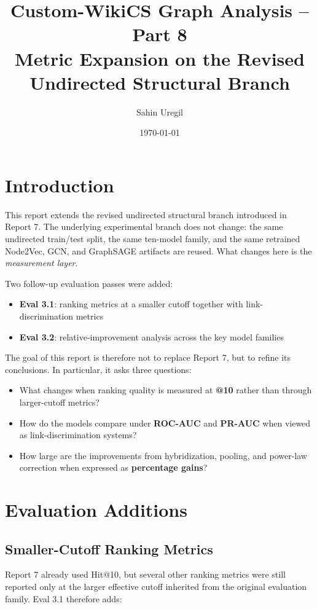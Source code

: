 \documentclass[11pt,a4paper]{article}
\title{Custom-WikiCS Graph Analysis -- Part 8\\[4pt]
\large Metric Expansion on the Revised Undirected Structural Branch}
\author{Sahin Uregil}
\date{\today}
\begin{document}
\maketitle

\section{Introduction}
This report extends the revised undirected structural branch introduced in
Report 7. The underlying experimental branch does not change: the same
undirected train/test split, the same ten-model family, and the same
retrained Node2Vec, GCN, and GraphSAGE artifacts are reused. What changes here
is the \emph{measurement layer}.

Two follow-up evaluation passes were added:

\begin{itemize}
    \item \textbf{Eval 3.1}: ranking metrics at a smaller cutoff together with
          link-discrimination metrics
    \item \textbf{Eval 3.2}: relative-improvement analysis across the key model
          families
\end{itemize}

The goal of this report is therefore not to replace Report 7, but to refine
its conclusions. In particular, it asks three questions:

\begin{itemize}
    \item What changes when ranking quality is measured at \textbf{@10} rather
          than through larger-cutoff metrics?
    \item How do the models compare under \textbf{ROC-AUC} and \textbf{PR-AUC}
          when viewed as link-discrimination systems?
    \item How large are the improvements from hybridization, pooling, and
          power-law correction when expressed as \textbf{percentage gains}?
\end{itemize}

\section{Evaluation Additions}

\subsection{Smaller-Cutoff Ranking Metrics}
Report 7 already used Hit@10, but several other ranking metrics were still
reported only at the larger effective cutoff inherited from the original
evaluation family. Eval 3.1 therefore adds:
\end{document}
